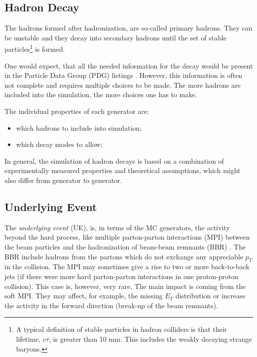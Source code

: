 \subsection{Hadron Decay}

The hadrons formed after hadronization, are so-called primary hadrons. They can be unstable and they decay into secondary hadrons
until the set of stable particles\footnote{A typical definition of stable particles in hadron colliders is that their
lifetime, $c\tau$, is greater than 10 mm. This includes the weakly decaying strange baryons.} is formed.

One would expect, that all the needed information for the decay would be present in the Particle Data Group (PDG) listings \cite{PDG-2012}.
However, this information is often not complete and requires multiple choices to be made. The more hadrons are included into the simulation,
the more choices one has to make.

The individual properties of each generator are:

\begin{itemize}
 \item which hadrons to include into simulation;
 \item which decay modes to allow;
\end{itemize}

In general, the simulation of hadron decays is based on a combination of experimentally measured properties and theoretical assumptions, which
might also differ from generator to generator.

\subsection{Underlying Event}

The \textit{underlying event} (UE), is, in terms of the MC generators, the activity beyond the hard process, like multiple parton-parton interactions
(MPI) between the beam particles and the hadronization of beam-beam remnants (BBR) \cite{Khachatryan:2015pea}. The BBR include hadrons from the partons 
which do not exchange any appreciable $p_{T}$ in the collision. The MPI may sometimes give a rise to two or more back-to-back jets (if there were more 
hard parton-parton interactions in one proton-proton collision). This case is, however, very rare. The main impact is coming from the soft MPI. They may 
affect, for example, the missing $E_{T}$ distribution or increase the activity in the forward direction (break-up of the beam remnants).

